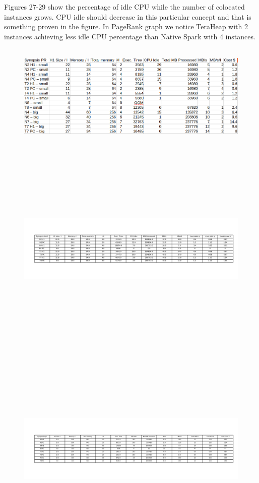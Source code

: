 \documentclass[twocolumn,10pt]{asme2e}
\begin{document}
Figures 27-29 show the percentage of idle CPU while the number of colocated instances grows. CPU idle should decrease in this particular concept and that is something proven in the figure. In PageRank graph we notice TeraHeap with 2 instances achieving less idle CPU percentage than Native Spark with 4 instances.
\begin{figure}[h!]
        \includegraphics[width=18cm,height=5cm]{pr_table.png}
\end{figure}

\begin{figure}[h!]
        \includegraphics[width=20cm,height=10cm]{linr_table.png}
\end{figure}

\begin{figure}[h!]
        \includegraphics[width=20cm,height=10cm]{logr_table.png}
\end{figure}
\end{document}
